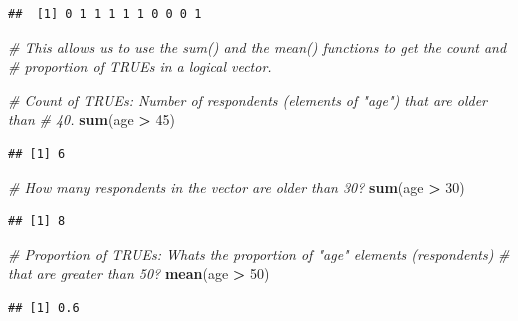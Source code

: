 \documentclass[
]{book}
\newenvironment{Shaded}{\begin{snugshade}}{\end{snugshade}}
\newcommand{\CommentTok}[1]{\textcolor[rgb]{0.56,0.35,0.01}{\textit{#1}}}
\newcommand{\DecValTok}[1]{\textcolor[rgb]{0.00,0.00,0.81}{#1}}
\newcommand{\FunctionTok}[1]{\textcolor[rgb]{0.13,0.29,0.53}{\textbf{#1}}}
\newcommand{\NormalTok}[1]{#1}
\newcommand{\SpecialCharTok}[1]{\textcolor[rgb]{0.81,0.36,0.00}{\textbf{#1}}}
\begin{document}
\begin{verbatim}
##  [1] 0 1 1 1 1 1 0 0 0 1
\end{verbatim}

\begin{Shaded}
\begin{Highlighting}[]
\CommentTok{\# This allows us to use the sum() and the mean() functions to get the count and}
\CommentTok{\# proportion of TRUE\textquotesingle{}s in a logical vector.}

\CommentTok{\# Count of TRUE\textquotesingle{}s: Number of respondents (elements of "age") that are older than}
\CommentTok{\# 40.}
\FunctionTok{sum}\NormalTok{(age }\SpecialCharTok{\textgreater{}} \DecValTok{45}\NormalTok{)}
\end{Highlighting}
\end{Shaded}

\begin{verbatim}
## [1] 6
\end{verbatim}

\begin{Shaded}
\begin{Highlighting}[]
\CommentTok{\# How many respondents in the vector are older than 30?}
\FunctionTok{sum}\NormalTok{(age }\SpecialCharTok{\textgreater{}} \DecValTok{30}\NormalTok{)}
\end{Highlighting}
\end{Shaded}

\begin{verbatim}
## [1] 8
\end{verbatim}

\begin{Shaded}
\begin{Highlighting}[]
\CommentTok{\# Proportion of TRUE\textquotesingle{}s: What\textquotesingle{}s the proportion of "age" elements (respondents)}
\CommentTok{\# that are greater than 50?}
\FunctionTok{mean}\NormalTok{(age }\SpecialCharTok{\textgreater{}} \DecValTok{50}\NormalTok{)}
\end{Highlighting}
\end{Shaded}

\begin{verbatim}
## [1] 0.6
\end{verbatim}
\end{document}
